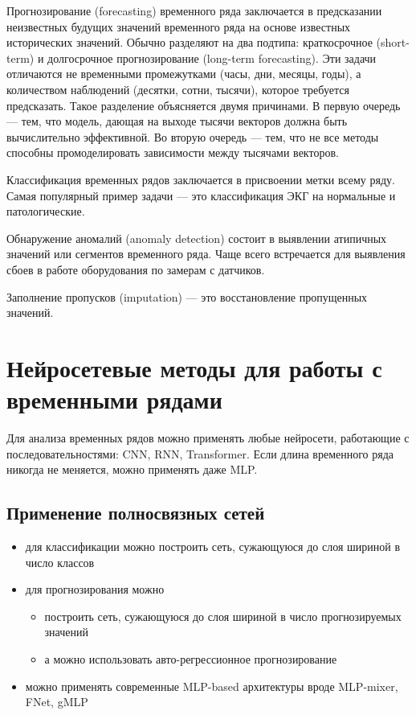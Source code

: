 \documentclass[12pt,fleqn]{article}
\begin{document}
Прогнозирование (forecasting) временного ряда заключается в предсказании неизвестных будущих значений временного ряда на основе известных исторических значений. Обычно разделяют на два подтипа: краткосрочное (short-term) и долгосрочное прогнозирование (long-term forecasting). Эти задачи отличаются не временными промежутками (часы, дни, месяцы, годы), а количеством наблюдений (десятки, сотни, тысячи), которое требуется предсказать. Такое разделение объясняется двумя причинами. В первую очередь — тем, что модель, дающая на выходе тысячи векторов должна быть вычислительно эффективной. Во вторую очередь — тем, что не все методы способны промоделировать зависимости между тысячами векторов.

Классификация временных рядов заключается в присвоении метки всему ряду. Самая популярный пример задачи — это классификация ЭКГ на нормальные и патологические.

Обнаружение аномалий (anomaly detection) состоит в выявлении атипичных значений или сегментов временного ряда. Чаще всего встречается для выявления сбоев в работе оборудования по замерам с датчиков.

Заполнение пропусков (imputation) — это восстановление пропущенных значений.

\section{Нейросетевые методы для работы с временными рядами}

Для анализа временных рядов можно применять любые нейросети, работающие с последовательностями: CNN, RNN, Transformer. Если длина временного ряда никогда не меняется, можно применять даже MLP. 

\subsection{Применение полносвязных сетей}

\begin{itemize}
    \item для классификации можно построить сеть, сужающуюся до слоя шириной в число классов
    \item для прогнозирования можно
    \begin{itemize}
        \item построить сеть, сужающуюся до слоя шириной в число прогнозируемых значений \cite{ltsflinear}
        \item а можно использовать авто-регрессионное прогнозирование
    \end{itemize}
    \item можно применять современные MLP-based архитектуры вроде MLP-mixer, FNet, gMLP \cite{tsmixer}
\end{itemize}
\end{document}
